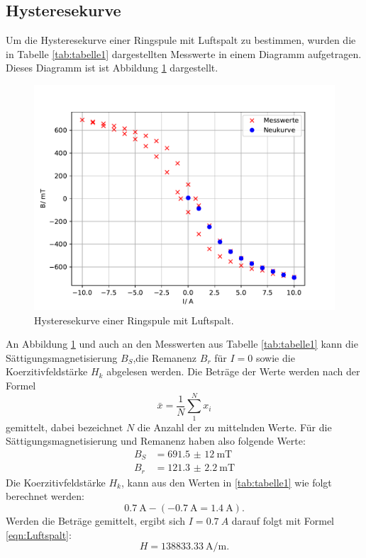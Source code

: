 \subsection{Hysteresekurve}
\noindent Um die Hysteresekurve einer Ringspule mit
Luftspalt zu bestimmen, wurden die in Tabelle
\ref{tab:tabelle1} dargestellten Messwerte in einem
Diagramm aufgetragen. Dieses Diagramm ist ist Abbildung
\ref{fig:plothys} dargestellt.

\begin{figure}
  \centering
  \includegraphics{plothys.pdf}
  \caption{Hysteresekurve einer Ringspule mit Luftspalt.}
  \label{fig:plothys}
\end{figure}
\noindent An Abbildung \ref{fig:plothys} und auch an den
Messwerten
aus Tabelle \ref{tab:tabelle1} kann die
Sättigungsmagnetisierung $B_{S}$,die Remanenz
$B_{r}$ für $I=0$ sowie die Koerzitivfeldstärke
$H_{k}$ abgelesen werden.
Die Beträge der Werte werden nach der Formel
\begin{equation}
  \bar{x}=\frac{1}{N}\sum_{1}^N x_{i}
  \label{eqn:mittel}
\end{equation}
gemittelt, dabei bezeichnet $N$ die Anzahl der zu
mittelnden Werte.
Für die Sättigungsmagnetisierung und
Remanenz haben also folgende Werte:
\begin{align*}
  B_{S} &=\SI{691,5(12)}{\milli\tesla} \\
  B_{r} &=\SI{121.3(22)}{\milli\tesla}
\end{align*}
Die Koerzitivfeldstärke $H_{k}$, kann aus den Werten in
\ref{tab:tabelle1} wie folgt berechnet werden:
\begin{equation}
  \SI{0,7}{\ampere}-(\SI{-0,7}{\ampere}=\SI{1,4}{\ampere}).
  \label{eqn:koerzitiv}
\end{equation}
\noindent Werden die Beträge gemittelt, ergibt sich $I=\SI{0.7}{A}$
darauf folgt mit Formel \ref{eqn:Luftspalt}:
\begin{equation*}
  H=\SI{138833,33}{\ampere \per \meter}.
\end{equation*}

